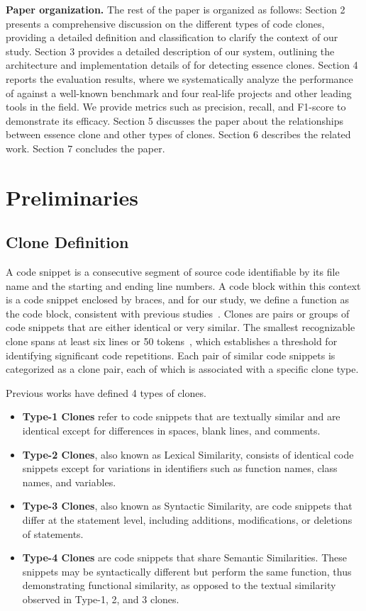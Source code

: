 \noindent \textbf{Paper organization.} 
The rest of the paper is organized as follows: 
Section 2 presents a comprehensive discussion on the different types of code clones, providing a detailed definition and classification to clarify the context of our study.
Section 3 provides a detailed description of our system, outlining the architecture and implementation details of \toolname for detecting essence clones.
Section 4 reports the evaluation results, where we systematically analyze the performance of \toolname against a well-known benchmark and four real-life projects and other leading tools in the field. We provide metrics such as precision, recall, and F1-score to demonstrate its efficacy.
Section 5 discusses the paper about the relationships between essence clone and other types of clones.
Section 6 describes the related work. 
Section 7 concludes the paper.


\section{Preliminaries}

\subsection{Clone Definition}
A code snippet is a consecutive segment of source code identifiable by its file name and the starting and ending line numbers. A code block within this context is a code snippet enclosed by braces, and for our study, we define a function as the code block, consistent with previous studies~\cite{sajnani2016sourcerercc,wang2018ccaligner}. Clones are pairs or groups of code snippets that are either identical or very similar. The smallest recognizable clone spans at least six lines or 50 tokens~\cite{bellon2007type1_4}, which establishes a threshold for identifying significant code repetitions. Each pair of similar code snippets is categorized as a clone pair, each of which is associated with a specific clone type.

Previous works have defined 4 types of clones. 
\begin{itemize}
    \item \textbf{Type-1 Clones} refer to code snippets that are textually similar and are identical except for differences in spaces, blank lines, and comments.
    \item \textbf{Type-2 Clones}, also known as Lexical Similarity, consists of identical code snippets except for variations in identifiers such as function names, class names, and variables.
    \item \textbf{Type-3 Clones}, also known as Syntactic Similarity, are code snippets that differ at the statement level, including additions, modifications, or deletions of statements. 
    \item \textbf{Type-4 Clones} are code snippets that share Semantic Similarities. These snippets may be syntactically different but perform the same function, thus demonstrating functional similarity, as opposed to the textual similarity observed in Type-1, 2, and 3 clones.
\end{itemize}

